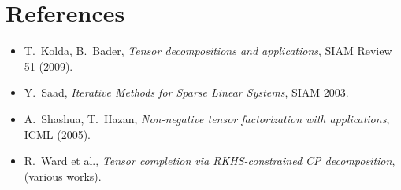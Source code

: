 \section*{References}
\begin{itemize}\setlength\itemsep{0.2em}
\item T.~Kolda, B.~Bader, \emph{Tensor decompositions and applications}, SIAM Review 51 (2009).
\item Y.~Saad, \emph{Iterative Methods for Sparse Linear Systems}, SIAM 2003.
\item A.~Shashua, T.~Hazan, \emph{Non-negative tensor factorization with applications}, ICML (2005).
\item R.~Ward et al., \emph{Tensor completion via RKHS-constrained CP decomposition}, (various works).
\end{itemize}


